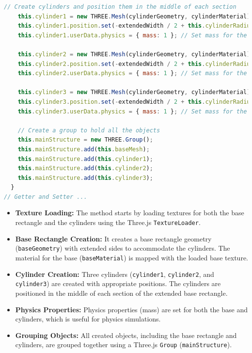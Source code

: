 \documentclass{article}
\begin{document}
\begin{lstlisting}[language=JavaScript, caption={JS Class for MainStructure}]
    // Create cylinders and position them in the middle of each section
    this.cylinder1 = new THREE.Mesh(cylinderGeometry, cylinderMaterial);
    this.cylinder1.position.set(-extendedWidth / 2 + this.cylinderRadius + sectionWidth / 2, this.baseHeight / 2 + this.cylinderHeight / 2, 0);
    this.cylinder1.userData.physics = { mass: 1 }; // Set mass for the cylinder

    this.cylinder2 = new THREE.Mesh(cylinderGeometry, cylinderMaterial);
    this.cylinder2.position.set(-extendedWidth / 2 + this.cylinderRadius + sectionWidth + sectionWidth / 2, this.baseHeight / 2 + this.cylinderHeight / 2, 0);
    this.cylinder2.userData.physics = { mass: 1 }; // Set mass for the cylinder

    this.cylinder3 = new THREE.Mesh(cylinderGeometry, cylinderMaterial);
    this.cylinder3.position.set(-extendedWidth / 2 + this.cylinderRadius + 2 * sectionWidth + sectionWidth / 2, this.baseHeight / 2 + this.cylinderHeight / 2, 0);
    this.cylinder3.userData.physics = { mass: 1 }; // Set mass for the cylinder

    // Create a group to hold all the objects
    this.mainStructure = new THREE.Group();
    this.mainStructure.add(this.baseMesh);
    this.mainStructure.add(this.cylinder1);
    this.mainStructure.add(this.cylinder2);
    this.mainStructure.add(this.cylinder3);
  }
// Getter and Setter ...
\end{lstlisting}


\begin{itemize}

\item \textbf{Texture Loading:} The method starts by loading textures for both the base rectangle and the cylinders using the Three.js \texttt{TextureLoader}.

\item \textbf{Base Rectangle Creation:} It creates a base rectangle geometry (\texttt{baseGeometry}) with extended sides to accommodate the cylinders. The material for the base (\texttt{baseMaterial}) is mapped with the loaded base texture.

\item \textbf{Cylinder Creation:} Three cylinders (\texttt{cylinder1}, \texttt{cylinder2}, and \texttt{cylinder3}) are created with appropriate positions. The cylinders are positioned in the middle of each section of the extended base rectangle.

\item \textbf{Physics Properties:} Physics properties (mass) are set for both the base and cylinders, which is useful for physics simulations.

\item \textbf{Grouping Objects:} All created objects, including the base rectangle and cylinders, are grouped together using a Three.js \texttt{Group} (\texttt{mainStructure}).

\end{itemize}
\end{document}
